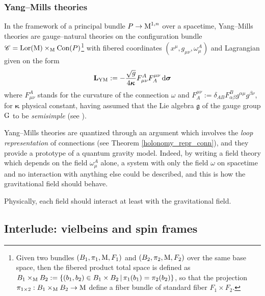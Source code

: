 
\subsubsection{Yang--Mills theories}
In the framework of a principal bundle $P\to\text{\normalfont M}^{1,n}$ over a spacetime, Yang--Mills theories are gauge--natural theories on the configuration bundle $\mathscr{C}=\text{\normalfont Lor}(\text{\normalfont M})\times_{\text{\normalfont M}}\text{\normalfont Con}(P)$\footnote{Given two bundles $(B_1,\pi_1,\text{\normalfont M},F_1)$ and $(B_2,\pi_2,\text{\normalfont M},F_2)$ over the same base space, then the fibered product total space is defined as $B_1\times_{\text{\normalfont M}} B_2:=\{(b_1,b_2)\in B_1\times B_2\,|\,\pi_1(b_1)=\pi_2(b_2)\}$, so that the projection $\pi_{1\times2}:B_1\times_{\text{\normalfont M}} B_2\to\text{\normalfont M}$ define a fiber bundle of standard fiber $F_1\times F_2$.} with fibered coordinates $(x^\mu,g_{\mu\nu},\omega_\mu^A)$ and Lagrangian given on the form 
\,\newline
$$\mathbf{L}_{\text{\normalfont{YM}}}:=-\frac{\sqrt{g}}{4\boldsymbol{\kappa}}F_{\mu\nu}^AF_A^{\mu\nu}\,\text{\normalfont d}\boldsymbol{\sigma}$$
where $F_{\mu\nu}^A$ stands for the curvature of the connection $\omega$ and $F^{\mu\nu}_A:=\delta_{AB}F^B_{\alpha\beta}g^{\alpha\mu} g^{\beta\nu}$, for $\boldsymbol{\kappa}$ physical constant, having assumed that the Lie algebra $\mathfrak{g}$ of the gauge group $\text{\normalfont G}$ to be \emph{semisimple} (see \cite{kirillov}). %

Yang--Mills theories are quantized through an argument which involves the \emph{loop representation} of connections (see Theorem \ref{holonomy_repr_conn}), and they provide a prototype of a quantum gravity model. Indeed, by writing a field theory which depends on the field $\omega_\mu^A$ alone, a system with only the field $\omega$ on spacetime and no interaction with anything else could be described, and this is how the gravitational field should behave. 

Physically, each field should interact at least with the gravitational field.


\subsection{Interlude: vielbeins and spin frames}\label{interlude}

